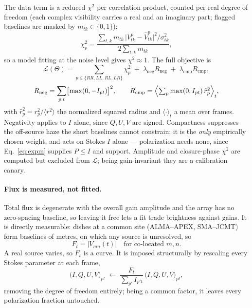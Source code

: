 \documentclass[11pt]{article}
\begin{document}
The data term is a reduced $\chi^2$ per correlation product, counted per real
degree of freedom (each complex visibility carries a real and an imaginary part;
flagged baselines are masked by $m_{tk}\in\{0,1\}$):
\begin{equation}
  \chi^2_p = \frac{\sum_{t,k} m_{tk}\,\bigl|V^p_{tk}-\hat V^p_{tk}\bigr|^2/\sigma_{tk}^2}
                  {2\sum_{t,k} m_{tk}},
  \label{eq:chi2}
\end{equation}
so a model fitting at the noise level gives $\chi^2\approx1$. The full objective is
\begin{equation}
  \mathcal{L}(\Theta)=\sum_{p\in\{RR,LL,RL,LR\}}\chi^2_p
  \;+\;\lambda_{\mathrm{neg}}R_{\mathrm{neg}}
  \;+\;\lambda_{\mathrm{cmp}}R_{\mathrm{cmp}},
  \label{eq:total}
\end{equation}
\begin{equation}
  R_{\mathrm{neg}}=\sum_{p,t}\bigl[\max(0,-I_{pt})\bigr]^2,
  \qquad
  R_{\mathrm{cmp}}=\Bigl\langle\textstyle\sum_p \max(0,I_{pt})\,\hat r_p^2\Bigr\rangle_t,
  \label{eq:penalties}
\end{equation}
with $\hat r_p^2=r_p^2/\langle r^2\rangle$ the normalized squared radius and
$\langle\cdot\rangle_t$ a mean over frames. Negativity applies to $I$ alone, since
$Q,U,V$ are signed. Compactness suppresses the off-source haze the short baselines
cannot constrain; it is the \emph{only} empirically chosen weight, and acts on
Stokes $I$ alone --- polarization needs none, since Eq.~\eqref{eq:expm} supplies
$P\le I$ and support. Amplitude and closure-phase $\chi^2$ are computed but
excluded from $\mathcal{L}$; being gain-invariant they are a calibration canary.

\paragraph{Flux is measured, not fitted.}
Total flux is degenerate with the overall gain amplitude and the array has no
zero-spacing baseline, so leaving it free lets a fit trade brightness against
gains. It is directly measurable: dishes at a common site (ALMA--APEX, SMA--JCMT)
form baselines of metres, on which any source is unresolved, so
\begin{equation}
  F_t = \bigl|V_{mn}(t)\bigr| \quad\text{for co-located } m,n.
  \label{eq:lightcurve}
\end{equation}
A real source varies, so $F_t$ is a curve. It is imposed structurally by rescaling
every Stokes parameter at each frame,
\begin{equation}
  \bigl(I,Q,U,V\bigr)_{pt}\;\longleftarrow\;
  \frac{F_t}{\sum_{p'}I_{p't}}\,\bigl(I,Q,U,V\bigr)_{pt},
  \label{eq:fixflux}
\end{equation}
removing the degree of freedom entirely; being a common factor, it leaves every
polarization fraction untouched.
\end{document}
